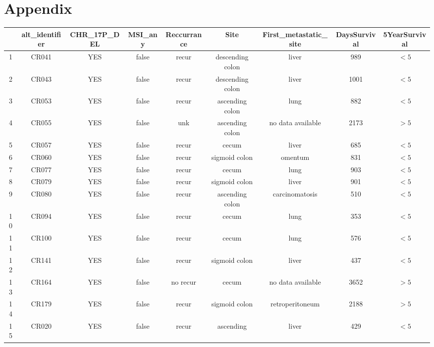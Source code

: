 

\section{Appendix}
\begin{table}
  \centering
  \caption{IMC colorectal cancer metadata }
  \begin{longtable}{|c|c|c|c|c|c|c|c|c|}
\hline
 & \textbf{alt\_identifier} & \textbf{CHR\_17P\_DEL} & \textbf{MSI\_any} & \textbf{Reccurrance} & \textbf{Site} & \textbf{First\_metastatic\_site} & \textbf{DaysSurvival} & \textbf{5YearSurvival} \\
\hline
1 & CR041 & YES & false & recur & descending colon & liver & 989 & $<5$ \\
\hline
2 &CR043 & YES & false & recur & descending colon & liver & 1001 & $<5$ \\
\hline
3 & CR053 & YES & false & recur & ascending colon & lung & 882 & $<5$ \\
\hline
4 & CR055 & YES & false & unk & ascending colon & no data available & 2173 & $>5$ \\
\hline
5 & CR057 & YES & false & recur & cecum & liver & 685 & $<5$ \\
\hline
6 & CR060 & YES & false & recur & sigmoid colon & omentum & 831 & $<5$ \\
\hline
7 &CR077 & YES & false & recur & cecum & lung & 903 & $<5$ \\
\hline
8 & CR079 & YES & false & recur & sigmoid colon & liver & 901 & $<5$ \\
\hline
9 & CR080 & YES & false & recur & ascending colon & carcinomatosis & 510 & $<5$ \\
\hline
10 & CR094 & YES & false & recur & cecum & lung & 353 & $<5$ \\
\hline
11 & CR100 & YES & false & recur & cecum & lung & 576 & $<5$ \\
\hline
12 & CR141 & YES & false & recur & sigmoid colon & liver & 437 & $<5$ \\
\hline
13 & CR164 & YES & false & no recur & cecum & no data available & 3652 & $>5$ \\
\hline
14 & CR179 & YES & false & recur & sigmoid colon & retroperitoneum & 2188 & $>5$ \\
\hline
15 & CR020 & YES & false & recur & ascending & liver & 429 & $<5$ \\

\end{longtable}
\end{table}

